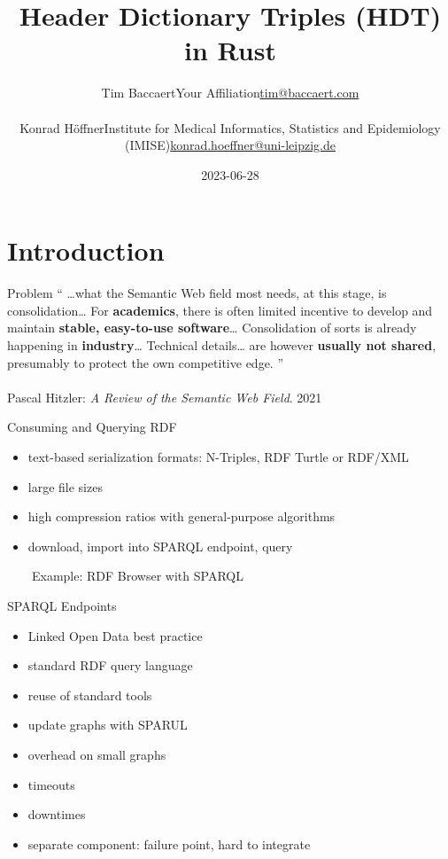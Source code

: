 \documentclass[14pt,aspectratio=169]{beamer}
\date{2023-06-28}
\author{
\small
\texorpdfstring{Tim Baccaert\newline{}Your Affiliation\newline{}\url{tim@baccaert.com}}{Tim Baccaert}\\~\\
\texorpdfstring{Konrad Höffner\newline{}Institute for Medical Informatics, Statistics and Epidemiology (IMISE)\newline{}\url{konrad.hoeffner@uni-leipzig.de}}{Konrad Höffner}
}
\title{Header Dictionary Triples (HDT) in Rust}
\subtitle{}
\newcommand{\imageslide}[4][]
{
\begin{frame}[plain]{~~~~#2}
\vspace{0.2em}
\centering\makebox[\linewidth]{\texttt{[image: \#3]}}
\\#1
\note{#4}
\end{frame}
}
\newcommand\pro{\item[$+$]}
\newcommand\con{\item[$-$]}
\begin{document}
\begin{frame}
\titlepage
\end{frame}

\section{Introduction}

\begin{frame}{Problem}
\enquote{
\ldots{}what the Semantic Web field most needs, at this stage, is consolidation\ldots
For \textbf{academics}, there is often limited incentive to develop and maintain \textbf{stable, easy-to-use software}\ldots
Consolidation of sorts is already happening in \textbf{industry}\ldots
Technical details\ldots{} are however \textbf{usually not shared}, presumably to protect the own competitive edge.
}
\\~\\
Pascal Hitzler: \emph{A Review of the Semantic Web Field}. 2021
\end{frame}

\begin{frame}{Consuming and Querying RDF}
\begin{itemize}
\item text-based serialization formats: N-Triples, RDF Turtle or RDF/XML
\item large file sizes
\item high compression ratios with general-purpose algorithms
\item download, import into SPARQL endpoint, query
\end{itemize}
\end{frame}

\imageslide{Example: RDF Browser with SPARQL}{img/architecture.pdf}{}

\begin{frame}{SPARQL Endpoints}
\begin{itemize}
\pro Linked Open Data best practice
\pro standard RDF query language
\pro reuse of standard tools
\pro update graphs with SPARUL
\pause
\con overhead on small graphs
\con timeouts
\con downtimes
\con separate component: failure point, hard to integrate
\end{itemize}
\end{frame}
\end{document}
